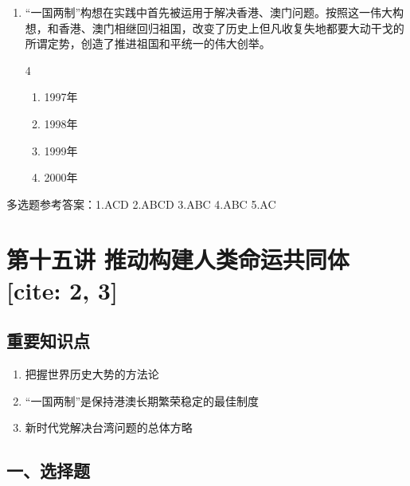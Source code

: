 \documentclass[a4paper,11pt]{ctexart}
\begin{document}
\begin{enumerate}
    \item “一国两制”构想在实践中首先被运用于解决香港、澳门问题。按照这一伟大构想，和香港、澳门相继回归祖国，改变了历史上但凡收复失地都要大动干戈的所谓定势，创造了推进祖国和平统一的伟大创举。
    \begin{multicols}{4}
    \begin{enumerate}
        \item 1997年
        \item 1998年
        \item 1999年
        \item 2000年
    \end{enumerate}
    \end{multicols}
\end{enumerate}

\begin{answerbox}
多选题参考答案：1.ACD \quad 2.ABCD \quad 3.ABC \quad 4.ABC \quad 5.AC
\end{answerbox}

\newpage

\section{第十五讲 推动构建人类命运共同体 [cite: 2, 3]}

\subsection{重要知识点}
\begin{enumerate}
    \item 把握世界历史大势的方法论
    \item “一国两制”是保持港澳长期繁荣稳定的最佳制度
    \item 新时代党解决台湾问题的总体方略
\end{enumerate}

\subsection{一、选择题}
\end{document}
